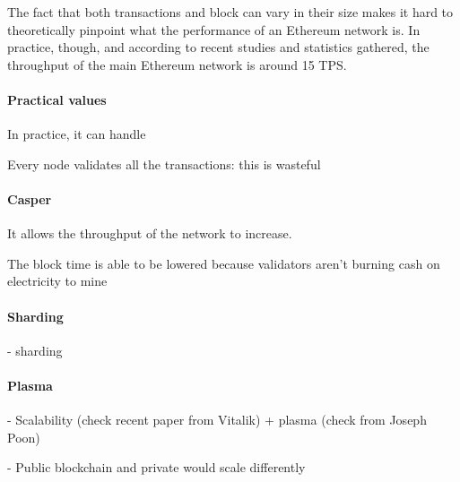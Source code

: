 The fact that both transactions and block can vary in their size makes it hard to theoretically pinpoint what the performance of an Ethereum network is. In practice, though, and according to recent studies and statistics gathered, the throughput of the main Ethereum network is around 15 TPS.

\paragraph{Practical values}
In practice, it can handle

 Every node validates all the transactions: this is wasteful

\paragraph{Casper}
It allows the throughput of the network to increase.

The block time is able to be lowered because validators aren't burning cash on electricity to mine

\paragraph{Sharding}
- sharding

\paragraph{Plasma}
- Scalability (check recent paper from Vitalik) + plasma (check from Joseph Poon)

- Public blockchain and private would scale differently
\break

